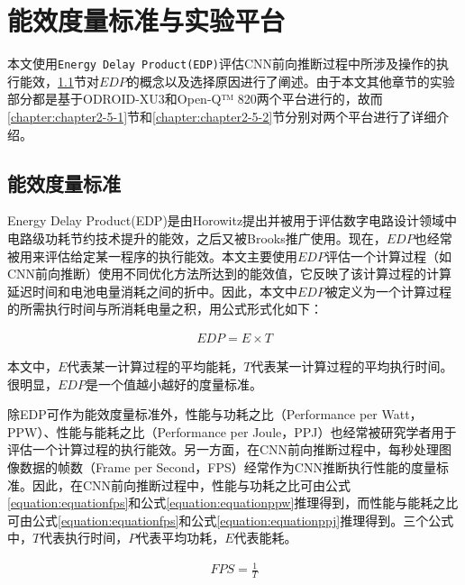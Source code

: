 \section{能效度量标准与实验平台}

本文使用\texttt{Energy Delay Product(EDP)}\cite{horowitz1994low}评估CNN前向推断过程中所涉及操作的执行能效，\ref{chapter:edp}节对$EDP$的概念以及选择原因进行了阐述。由于本文其他章节的实验部分都是基于ODROID-XU3\cite{hardkernel.com}和Open-Q™ 820\cite{intrinsyc.com}两个平台进行的，故而\ref{chapter:chapter2-5-1}节和\ref{chapter:chapter2-5-2}节分别对两个平台进行了详细介绍。

\subsection{能效度量标准}
\label{chapter:edp}

Energy Delay Product(EDP)是由Horowitz提出并被用于评估数字电路设计领域中电路级功耗节约技术提升的能效，之后又被Brooks推广使用\cite{brooks2000power}。现在，$EDP$也经常被用来评估给定某一程序的执行能效。本文主要使用$EDP$评估一个计算过程（如CNN前向推断）使用不同优化方法所达到的能效值，它反映了该计算过程的计算延迟时间和电池电量消耗之间的折中。因此，本文中$EDP$被定义为一个计算过程的所需执行时间与所消耗电量之积，用公式形式化如下：

\begin{equation}
     \label{equation:equation1}
     \begin{aligned}
        EDP = E \times T
     \end{aligned}
\end{equation}

\noindent 本文中，$E$代表某一计算过程的平均能耗，$T$代表某一计算过程的平均执行时间。很明显，$EDP$是一个值越小越好的度量标准。

除EDP可作为能效度量标准外，性能与功耗之比（Performance per Watt，PPW）、性能与能耗之比（Performance per Joule，PPJ）也经常被研究学者用于评估一个计算过程的执行能效。另一方面，在CNN前向推断过程中，每秒处理图像数据的帧数（Frame per Second，FPS\cite{wang2017building}）经常作为CNN推断执行性能的度量标准。因此，在CNN前向推断过程中，性能与功耗之比可由公式\ref{equation:equationfps}和公式\ref{equation:equationppw}推理得到，而性能与能耗之比可由公式\ref{equation:equationfps}和公式\ref{equation:equationppj}推理得到。三个公式中，$T$代表执行时间，$P$代表平均功耗，$E$代表能耗。

\begin{equation}
     \label{equation:equationfps}
     \begin{aligned}
        FPS = \frac{1}{T}
     \end{aligned}
\end{equation}

